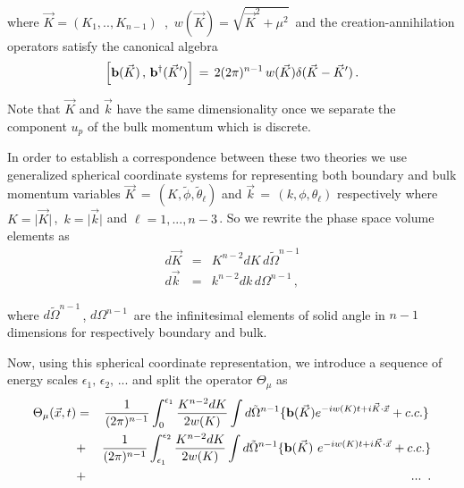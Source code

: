 \documentclass[a4paper,12pt]{article}
\begin{document}
\noindent where $\vec K = (K_1, ..,K_{n-1})\,$ ,\, 
$ w(\vec K ) = \sqrt{ {\vec K}^2 + \mu^2}$\, and the creation-annihilation
operators satisfy the canonical algebra
\begin{equation}
\label{canonical2}
\Big[ {\bf b}( \vec K )\,,\,{\bf b}^\dagger ({ \vec K }^\prime  )
\Big]\,=\, 2 (2\pi)^{n-1} \,w( \vec K ) \delta ( \vec K -
{ \vec K}^\prime ) \,.
\end{equation}

\noindent Note that $\vec K$ and $\vec k$ have the same dimensionality
once we separate the component $u_p$ of the bulk momentum which is discrete.

In order to establish a correspondence between these two theories we use 
generalized spherical coordinate systems for representing 
both boundary and bulk momentum variables 
$\vec K \,=\,(K,\tilde\phi,{\tilde\theta}_\ell)$
and $\vec k \,=\, (k,\phi,\theta_\ell)$ respectively  
where $ K = \vert \vec K \vert \,$, $\, k = \vert \vec k \vert $
and $\ell = 1,..., n-3\,$. 
So we rewrite the phase space volume elements as 
\begin{eqnarray}
d\vec K &=& K^{n-2} d K \, d {\tilde \Omega}^{n-1} \nonumber\\
d\vec k &=& k^{n-2} d k \, d \Omega^{n-1}\,,
\end{eqnarray}

\noindent where $d {\tilde \Omega}^{n-1}\,$, $d \Omega^{n-1}\,$ 
are the infinitesimal elements of solid 
angle in $n-1$ dimensions for respectively  boundary and bulk.

Now, using this spherical coordinate representation, we introduce a 
sequence of energy scales $\epsilon_1 , \,\epsilon_2,\,...$
and split the operator $\Theta_\mu$ as 
\begin{eqnarray}
\label{BF2}
\Theta_\mu ( \vec x ,t) & = &
{1\over (2\pi)^{n-1}}
\int^{\epsilon_1}_{0} { K^{n-2}dK \over 2 w(K) }\int d {\tilde \Omega}^{n-1}
\lbrace  {\bf b}( \vec K )
 e^{-iw(K) t +i \vec K \cdot \vec x}
+  c.c.\rbrace\,
\nonumber\\
&+&{1\over (2\pi)^{n-1}}
\int^{\epsilon_2}_{\epsilon_1} {K^{n-2}dK \over 2 w(K) } 
\int d {\tilde \Omega}^{n-1}
\lbrace { {\bf b}( \vec K )\ }
 e^{-iw(K) t +i \vec K \cdot  \vec x}
+c.c.\rbrace \nonumber\\
&+& ...\,\,\,.
\end{eqnarray}
\end{document}
